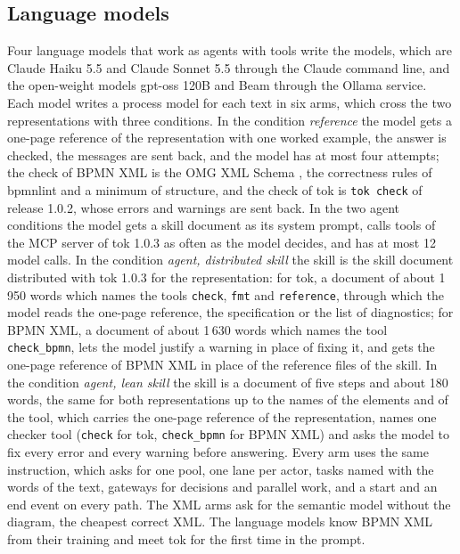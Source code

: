 \documentclass[11pt,a4paper]{article}
\begin{document}
\subsection{Language models}

Four language models that work as agents with tools write the models, which are Claude Haiku 5.5 and Claude Sonnet 5.5 through the Claude command line, and the open-weight models gpt-oss 120B and Beam through the Ollama service. Each model writes a process model for each text in six arms, which cross the two representations with three conditions. In the condition \emph{reference} the model gets a one-page reference of the representation with one worked example, the answer is checked, the messages are sent back, and the model has at most four attempts; the check of BPMN XML is the OMG XML Schema \citep{OMG2014BPMN}, the correctness rules of bpmnlint \citep{bpmnlint} and a minimum of structure, and the check of tok is \texttt{tok check} of release 1.0.2, whose errors and warnings are sent back. In the two agent conditions the model gets a skill document as its system prompt, calls tools of the MCP server of tok 1.0.3 as often as the model decides, and has at most 12 model calls. In the condition \emph{agent, distributed skill} the skill is the skill document distributed with tok 1.0.3 for the representation: for tok, a document of about 1\,950 words which names the tools \texttt{check}, \texttt{fmt} and \texttt{reference}, through which the model reads the one-page reference, the specification or the list of diagnostics; for BPMN XML, a document of about 1\,630 words which names the tool \texttt{check\_bpmn}, lets the model justify a warning in place of fixing it, and gets the one-page reference of BPMN XML in place of the reference files of the skill. In the condition \emph{agent, lean skill} the skill is a document of five steps and about 180 words, the same for both representations up to the names of the elements and of the tool, which carries the one-page reference of the representation, names one checker tool (\texttt{check} for tok, \texttt{check\_bpmn} for BPMN XML) and asks the model to fix every error and every warning before answering. Every arm uses the same instruction, which asks for one pool, one lane per actor, tasks named with the words of the text, gateways for decisions and parallel work, and a start and an end event on every path. The XML arms ask for the semantic model without the diagram, the cheapest correct XML. The language models know BPMN XML from their training and meet tok for the first time in the prompt.
\end{document}
